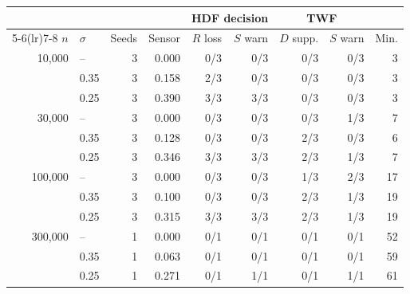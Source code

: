 \begin{tabular}{@{}rlrrrrrrr@{}}
\toprule
& & & & \multicolumn{2}{c}{HDF decision} & \multicolumn{2}{c}{TWF} & \\
\cmidrule(lr){5-6}\cmidrule(lr){7-8}
$n$ & $\sigma$ & Seeds & Sensor & $R$ loss & $S$ warn & $D$ supp. & $S$ warn & Min. \\
\midrule
10{,}000 & -- & 3 & 0.000 & 0/3 & 0/3 & 0/3 & 0/3 & 3 \\
 & 0.35 & 3 & 0.158 & 2/3 & 0/3 & 0/3 & 0/3 & 3 \\
 & 0.25 & 3 & 0.390 & 3/3 & 3/3 & 0/3 & 0/3 & 3 \\
30{,}000 & -- & 3 & 0.000 & 0/3 & 0/3 & 0/3 & 1/3 & 7 \\
 & 0.35 & 3 & 0.128 & 0/3 & 0/3 & 2/3 & 0/3 & 6 \\
 & 0.25 & 3 & 0.346 & 3/3 & 3/3 & 2/3 & 1/3 & 7 \\
100{,}000 & -- & 3 & 0.000 & 0/3 & 0/3 & 1/3 & 2/3 & 17 \\
 & 0.35 & 3 & 0.100 & 0/3 & 0/3 & 2/3 & 1/3 & 19 \\
 & 0.25 & 3 & 0.315 & 3/3 & 3/3 & 2/3 & 1/3 & 19 \\
300{,}000 & -- & 1 & 0.000 & 0/1 & 0/1 & 0/1 & 0/1 & 52 \\
 & 0.35 & 1 & 0.063 & 0/1 & 0/1 & 0/1 & 0/1 & 59 \\
 & 0.25 & 1 & 0.271 & 0/1 & 1/1 & 0/1 & 1/1 & 61 \\
\bottomrule
\end{tabular}
